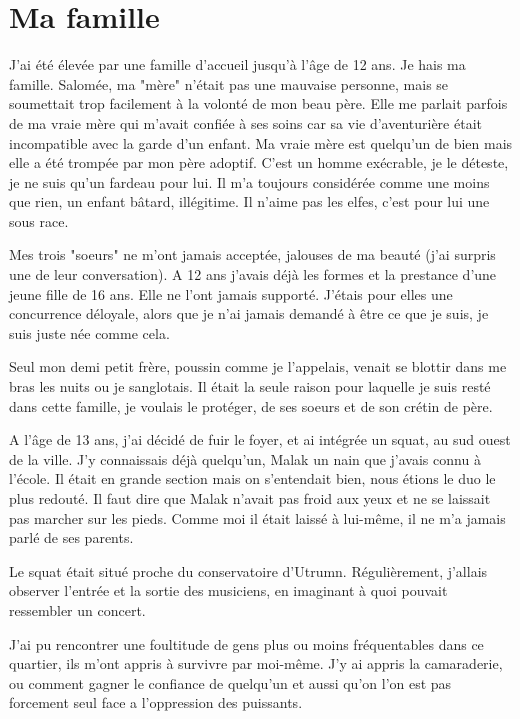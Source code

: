 \documentclass[10pt,a4paper,twoside,twocolumn,openany]{book}
\begin{document}
\section{Ma famille}

J'ai été élevée par une famille d'accueil jusqu'à l'âge de 12 ans. Je hais ma famille.
Salomée, ma "mère" n'était pas une mauvaise personne, mais se soumettait trop
facilement à la volonté de mon beau père. Elle me parlait parfois 
de ma vraie mère qui m'avait confiée à ses soins car sa vie d'aventurière était incompatible
avec la garde d'un enfant. Ma vraie mère est quelqu'un de bien mais elle a été trompée par mon
père adoptif. C'est un homme exécrable, je le déteste, je ne suis qu'un fardeau pour lui. Il 
m'a toujours considérée comme une moins que rien, un enfant bâtard, illégitime. Il n'aime pas
les elfes, c'est pour lui une sous race.

Mes trois "soeurs" ne m'ont jamais acceptée, jalouses de ma beauté (j'ai surpris une
de leur conversation). A 12 ans j'avais déjà les formes et la prestance d'une jeune fille de 16
ans. Elle ne l'ont jamais supporté. J'étais pour elles une concurrence déloyale, alors que je n'ai
jamais demandé à être ce que je suis, je suis juste née comme cela.

Seul mon demi petit frère, poussin comme je l'appelais, venait se blottir dans me bras
les nuits ou je sanglotais. Il était la seule raison pour laquelle je suis resté dans cette famille,
je voulais le protéger, de ses soeurs et de son crétin de père.

A l'âge de 13 ans, j'ai décidé de fuir le foyer, et ai intégrée un squat, au sud ouest de la ville.
J'y connaissais déjà quelqu'un, Malak un nain que j'avais
connu à l'école. Il était en grande section mais on s'entendait bien, nous étions le duo le plus
redouté. Il faut dire que Malak n'avait pas froid aux yeux et ne se laissait pas marcher sur les pieds.
Comme moi il était laissé à lui-même, il ne m'a jamais parlé de ses parents.

Le squat était situé proche du conservatoire d'Utrumn. Régulièrement, j'allais observer 
l'entrée et la sortie des musiciens, en imaginant à quoi pouvait ressembler
un concert. 

J'ai pu rencontrer une foultitude de gens plus ou moins fréquentables dans
ce quartier, ils m'ont appris à survivre par moi-même.
J'y ai appris la camaraderie, ou comment gagner le confiance de quelqu'un
et aussi qu'on l'on est pas forcement seul face a l'oppression des puissants.
\end{document}
